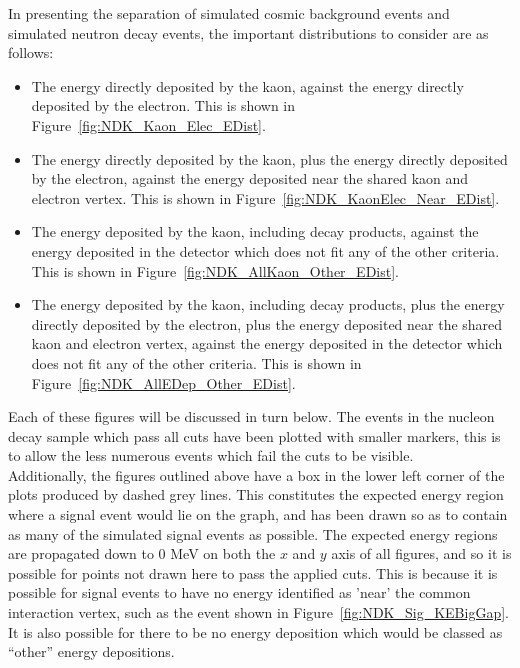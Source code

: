 In presenting the separation of simulated cosmic background events and simulated neutron decay events, the important distributions to consider are as follows:
\begin{itemize}
\item The energy directly deposited by the kaon, against the energy directly deposited by the electron. This is shown in Figure~\ref{fig:NDK_Kaon_Elec_EDist}.
\item The energy directly deposited by the kaon, plus the energy directly deposited by the electron, against the energy deposited near the shared kaon and electron vertex. This is shown in Figure~\ref{fig:NDK_KaonElec_Near_EDist}.
\item The energy deposited by the kaon, including decay products, against the energy deposited in the detector which does not fit any of the other criteria. This is shown in Figure~\ref{fig:NDK_AllKaon_Other_EDist}.
\item The energy deposited by the kaon, including decay products, plus the energy directly deposited by the electron, plus the energy deposited near the shared kaon and electron vertex, against the energy deposited in the detector which does not fit any of the other criteria. This is shown in Figure~\ref{fig:NDK_AllEDep_Other_EDist}.
\end{itemize}
Each of these figures will be discussed in turn below. The events in the nucleon decay sample which pass all cuts have been plotted with smaller markers, this is to allow the less numerous events which fail the cuts to be visible. \\

Additionally, the figures outlined above have a box in the lower left corner of the plots produced by dashed grey lines. This constitutes the expected energy region where a signal event would lie on the graph, and has been drawn so as to contain as many of the simulated signal events as possible. The expected energy regions are propagated down to 0 MeV on both the $x$ and $y$ axis of all figures, and so it is possible for points not drawn here to pass the applied cuts. This is because it is possible for signal events to have no energy identified as 'near' the common interaction vertex, such as the event shown in Figure~\ref{fig:NDK_Sig_KEBigGap}. It is also possible for there to be no energy deposition which would be classed as ``other'' energy depositions. \\


